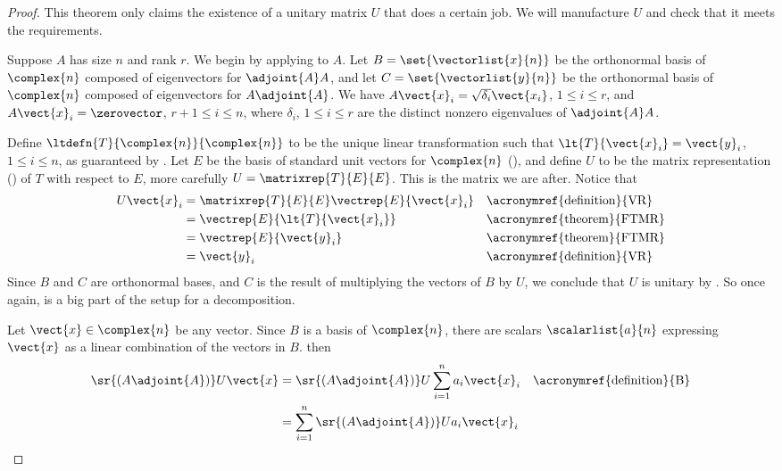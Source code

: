 \begin{proof}
This theorem only claims the existence of a unitary matrix $U$ that does a certain job.  We will manufacture $U$ and check that it meets the requirements.\par
%
Suppose $A$ has size $n$ and rank $r$.  We begin by applying  to $A$.  Let $B=\set{\vectorlist{x}{n}}$ be the orthonormal basis of $\complex{n}$ composed of eigenvectors for $\adjoint{A}A$, and let $C=\set{\vectorlist{y}{n}}$ be the orthonormal basis of $\complex{n}$ composed of eigenvectors for $A\adjoint{A}$.  We have $A\vect{x}_i=\sqrt{\delta_i}\vect{x_i}$, $1\leq i\leq r$, and $A\vect{x}_i=\zerovector$, $r+1\leq i\leq n$, where $\delta_i$, $1\leq i\leq r$ are the distinct nonzero eigenvalues of $\adjoint{A}A$.\par
%
Define $\ltdefn{T}{\complex{n}}{\complex{n}}$ to be the unique linear transformation such that $\lt{T}{\vect{x}_i}=\vect{y}_i$, $1\leq i\leq n$, as guaranteed by .  Let $E$ be the basis of standard unit vectors for $\complex{n}$ (), and define $U$ to be the matrix representation () of $T$ with respect to $E$, more carefully $U=\matrixrep{T}{E}{E}$.  This is the matrix we are after. 
Notice that 
%
\begin{align*}
U\vect{x}_i
&=
\matrixrep{T}{E}{E}\vectrep{E}{\vect{x}_i}
&&\text{\acronymref{definition}{VR}}\\
%
&=\vectrep{E}{\lt{T}{\vect{x}_i}}
&&\text{\acronymref{theorem}{FTMR}}\\
%
&=\vectrep{E}{\vect{y}_i}
&&\text{\acronymref{theorem}{FTMR}}\\
%
&=\vect{y}_i
&&\text{\acronymref{definition}{VR}}
%
\end{align*}
%
Since $B$ and $C$ are orthonormal bases, and $C$ is the result of multiplying the vectors of $B$ by $U$, we conclude that $U$ is unitary by .  So once again,  is a big part of the setup for a decomposition.\par
%
Let $\vect{x}\in\complex{n}$ be any vector.  Since $B$ is a basis of $\complex{n}$, there are scalars $\scalarlist{a}{n}$ expressing $\vect{x}$ as a linear combination of the vectors in $B$.  then
%
\begin{align*}
\sr{\left(A\adjoint{A}\right)}U\vect{x}
&=\sr{\left(A\adjoint{A}\right)}U\sum_{i=1}^{n}a_i\vect{x}_i
&&\text{\acronymref{definition}{B}}\\
%
&=\sum_{i=1}^{n}\sr{\left(A\adjoint{A}\right)}Ua_i\vect{x}_i

\end{align*}
\end{proof}

